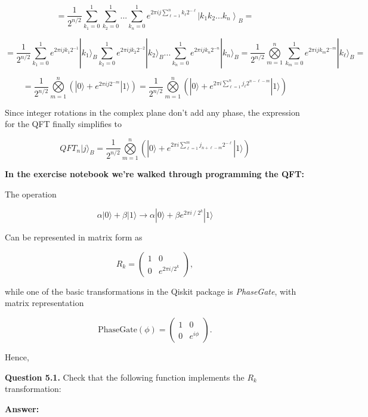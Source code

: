 \documentclass[11pt]{article}
\begin{document}
\[
= \frac{1}{2^{n/2}}\sum^{1}_{k_1=0}\sum^{1}_{k_2=0}...\sum^{1}_{k_n=0}
e^{2\pi i j \sum\limits_{\ell=1}^{n} k_\ell 2^{-\ell}}\left|k_1 k_2 ... k_n\right\rangle_{B} =
\]

\[
= \frac{1}{2^{n/2}}\sum^{1}_{k_1=0}e^{2\pi i j k_1 2^{-1}}|k_1\rangle_B
\sum^{1}_{k_2=0}e^{2\pi i j k_2 2^{-2}}|k_2\rangle_B... 
\sum^{1}_{k_n=0}e^{2\pi i j k_n 2^{-n}}|k_n\rangle_B = 
\frac{1}{2^{n/2}} \bigotimes\limits_{m=1}^{n}\sum\limits_{k_m=0}^1 e^{2\pi i j k_m 2^{-m}}|k_\ell\rangle_B = 
\]

\[
= \frac{1}{2^{n/2}} \bigotimes\limits_{m=1}^{n}\left(|0\rangle + e^{2\pi i j 2^{-m}}|1\rangle \right) = 
\frac{1}{2^{n/2}} \bigotimes\limits_{m=1}^{n}\left(|0\rangle + e^{2\pi i \sum\limits_{\ell=1}^n j_\ell 2^{n-\ell-m}}|1\rangle \right) 
\]

Since integer rotations in the complex plane don't add any phase, the
expression for the QFT finally simplifies to

\[
QFT_n |j\rangle_{B} = \frac{1}{2^{n/2}} \bigotimes\limits_{m=1}^{n}\left(|0\rangle + e^{2\pi i \sum\limits_{\ell=1}^{m} j_{n+\ell-m} 2^{-\ell}}|1\rangle \right) 
\]

    \textbf{In the exercise notebook we're walked through programming the
QFT:}

The operation

\[\alpha |0\rangle + \beta | 1 \rangle \rightarrow  \alpha | 0 \rangle +\beta e^{2\pi i\ /\ 2^k} | 1 \rangle \]

Can be represented in matrix form as

\[R_k = \begin{pmatrix}
1 & 0 \\
0 & e^{2\pi i /2^k}
\end{pmatrix},\]

while one of the basic transformations in the Qiskit package is
\emph{PhaseGate}, with matrix representation

\[\text{PhaseGate}(\phi) = \begin{pmatrix}
1 & 0 \\
0 & e^{i\phi}
\end{pmatrix}.\]

Hence,

\textbf{Question 5.1.} Check that the following function implements the
\(R_k\) transformation:

\textbf{Answer:}
\end{document}
